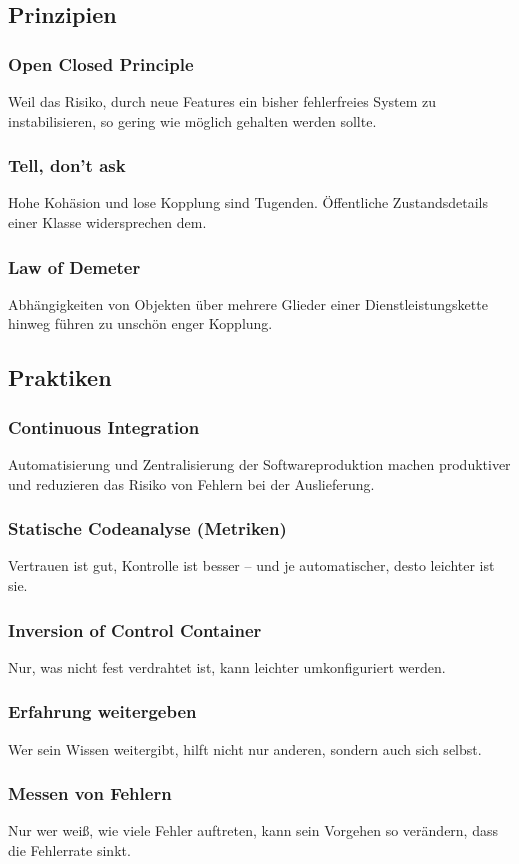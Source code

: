 \documentclass[a5paper, landscape]{article}
\begin{document}
	\newpage
	\begin{minipage}[t]{.5\textwidth}
		\subsection*{Prinzipien}
		\subsubsection*{Open Closed Principle}
		Weil das Risiko, durch neue Features ein bisher fehlerfreies System zu instabilisieren, so gering wie möglich gehalten werden sollte.
		\subsubsection*{Tell, don't ask}
		Hohe Kohäsion und lose Kopplung sind Tugenden. Öffentliche Zustandsdetails einer Klasse widersprechen dem.
		\subsubsection*{Law of Demeter}
		Abhängigkeiten von Objekten über mehrere Glieder einer Dienstleistungskette hinweg führen zu unschön enger Kopplung.	
	\end{minipage}
	\hspace{0.5cm}
	\begin{minipage}[t]{.5\textwidth}
		\subsection*{Praktiken}
		\subsubsection*{Continuous Integration}
		Automatisierung und Zentralisierung der Softwareproduktion machen produktiver und reduzieren das Risiko von Fehlern bei der Auslieferung.
		\subsubsection*{Statische Codeanalyse (Metriken)}
		Vertrauen ist gut, Kontrolle ist besser – und je automatischer, desto leichter ist sie.
		\subsubsection*{Inversion of Control Container}
		Nur, was nicht fest verdrahtet ist, kann leichter umkonfiguriert werden.
		\subsubsection*{Erfahrung weitergeben}
		Wer sein Wissen weitergibt, hilft nicht nur anderen, sondern auch sich selbst.
		\subsubsection*{Messen von Fehlern}
		Nur wer weiß, wie viele Fehler auftreten, kann sein Vorgehen so verändern, dass die Fehlerrate sinkt.
	\end{minipage}
\end{document}

